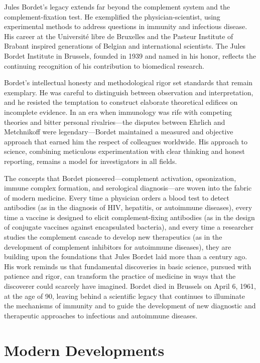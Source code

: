 Jules Bordet's legacy extends far beyond the complement system and the complement-fixation test. He exemplified the physician-scientist, using experimental methods to address questions in immunity and infectious disease. His career at the Universit\'e libre de Bruxelles and the Pasteur Institute of Brabant inspired generations of Belgian and international scientists. The Jules Bordet Institute in Brussels, founded in 1939 and named in his honor, reflects the continuing recognition of his contribution to biomedical research.\cite{bordet-biographical,bordet-institute}

Bordet's intellectual honesty and methodological rigor set standards that remain exemplary. He was careful to distinguish between observation and interpretation, and he resisted the temptation to construct elaborate theoretical edifices on incomplete evidence. In an era when immunology was rife with competing theories and bitter personal rivalries---the disputes between Ehrlich and Metchnikoff were legendary---Bordet maintained a measured and objective approach that earned him the respect of colleagues worldwide. His approach to science, combining meticulous experimentation with clear thinking and honest reporting, remains a model for investigators in all fields.

The concepts that Bordet pioneered---complement activation, opsonization, immune complex formation, and serological diagnosis---are woven into the fabric of modern medicine. Every time a physician orders a blood test to detect antibodies (as in the diagnosis of HIV, hepatitis, or autoimmune diseases), every time a vaccine is designed to elicit complement-fixing antibodies (as in the design of conjugate vaccines against encapsulated bacteria), and every time a researcher studies the complement cascade to develop new therapeutics (as in the development of complement inhibitors for autoimmune diseases), they are building upon the foundations that Jules Bordet laid more than a century ago. His work reminds us that fundamental discoveries in basic science, pursued with patience and rigor, can transform the practice of medicine in ways that the discoverer could scarcely have imagined. Bordet died in Brussels on April 6, 1961, at the age of 90, leaving behind a scientific legacy that continues to illuminate the mechanisms of immunity and to guide the development of new diagnostic and therapeutic approaches to infectious and autoimmune diseases.


\section{Modern Developments}

